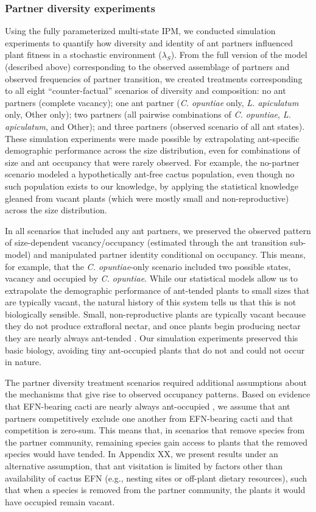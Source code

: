 \documentclass[11pt]{article}
\begin{document}
\subsubsection*{Partner diversity experiments}
Using the fully parameterized multi-state IPM, we conducted simulation experiments to quantify how diversity and identity of ant partners influenced plant fitness in a stochastic environment ($\lambda_{S}$). 
From the full version of the model (described above) corresponding to the observed assemblage of partners and observed frequencies of partner transition, we created treatments corresponding to all eight ``counter-factual'' scenarios of diversity and composition: no ant partners (complete vacancy); one ant partner (\textit{C. opuntiae} only, \textit{L. apiculatum} only, Other only); two partners (all pairwise combinations of \textit{C. opuntiae}, \textit{L. apiculatum}, and Other); and three partners (observed scenario of all ant states).
These simulation experiments were made possible by extrapolating ant-specific demographic performance across the size distribution, even for combinations of size and ant occupancy that were rarely observed. 
For example, the no-partner scenario modeled a hypothetically ant-free cactus population, even though no such population exists to our knowledge, by applying the statistical knowledge gleaned from vacant plants (which were mostly small and non-reproductive) across the size distribution. 

In all scenarios that included any ant partners, we preserved the observed pattern of size-dependent vacancy/occupancy (estimated through the ant transition sub-model) and manipulated partner identity conditional on occupancy. 
This means, for example, that the \textit{C. opuntiae}-only scenario included two possible states, vacancy and occupied by \textit{C. opuntiae}. 
While our statistical models allow us to extrapolate the demographic performance of ant-tended plants to small sizes that are typically vacant, the natural history of this system tells us that this is not biologically sensible. 
Small, non-reproductive plants are typically vacant because they do not produce extrafloral nectar, and once plants begin producing nectar they are nearly always ant-tended \citep{Miller2014}. 
Our simulation experiments preserved this basic biology, avoiding tiny ant-occupied plants that do not and could not occur in nature. 

The partner diversity treatment scenarios required additional assumptions about the mechanisms that give rise to observed occupancy patterns. 
Based on evidence that EFN-bearing cacti are nearly always ant-occupied \citep{Miller2014}, we assume that ant partners competitively exclude one another from EFN-bearing cacti and that competition is zero-sum. 
This means that, in scenarios that remove species from the partner community, remaining species gain access to plants that the removed species would have tended. 
In Appendix XX, we present results under an alternative assumption, that ant visitation is limited by factors other than availability of cactus EFN (e.g., nesting sites or off-plant dietary resources), such that when a species is removed from the partner community, the plants it would have occupied remain vacant. 
\end{document}
